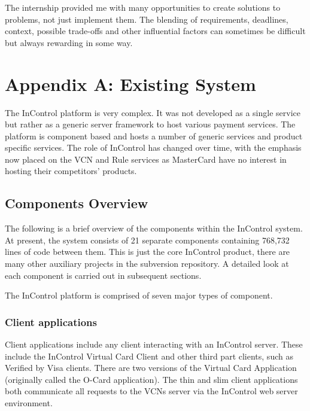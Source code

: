 \documentclass[a4paper, 11pt, titlepage]{article}
\begin{document}
The internship provided me with many opportunities to create solutions to problems, not just implement them. The blending of requirements, deadlines, context, possible trade-offs and other influential factors can sometimes be difficult but always rewarding in some way.
 
\section{Appendix A: Existing System} 
 
The InControl platform is very complex. It was not developed as a single service but rather as a generic server framework to host various payment services. The platform is component based and hosts a number of generic services and product specific services. The role of InControl has changed over time, with the emphasis now placed on the VCN and Rule services as MasterCard have no interest in hosting their competitors’ products. 
 
\subsection{Components Overview} 
The following is a brief overview of the components within the InControl system. At present, the system consists of 21 separate components containing 768,732\cite{SLOC} lines of code between them. This is just the core InControl product, there are many other auxiliary projects in the subversion repository. A detailed look at each component is carried out in subsequent sections. 
 
The InControl platform is comprised of seven major types of component. 
\subsubsection{Client applications} 
Client applications include any client interacting with an InControl server. These include the InControl Virtual Card Client and other third part clients, such as Verified by Visa clients. There are two versions of the Virtual Card Application (originally called the O-Card application). The thin and slim client applications both communicate all requests to the VCNs server via the InControl web server environment. 
\end{document}
